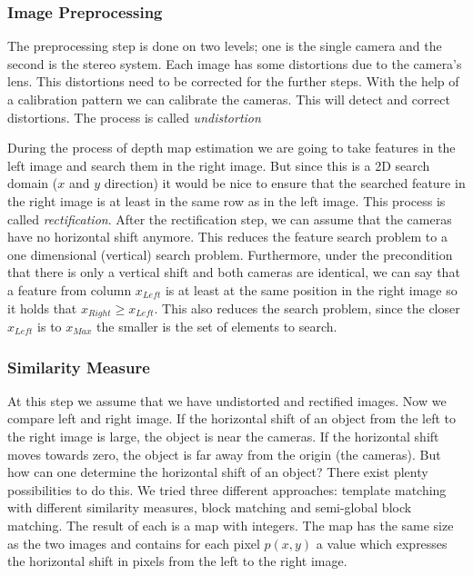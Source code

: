 \documentclass[11pt]{article}
\begin{document}
\subsubsection{Image Preprocessing} %
The preprocessing step is done on two levels; one is the single camera and the second is the stereo system. Each image has some distortions due to the camera's lens. This distortions need to be corrected for the further steps. With the help of a calibration pattern we can calibrate the cameras. This will detect and correct distortions. The process is called \emph{undistortion}

During the process of depth map estimation we are going to take features in the left image and search them in the right image. But since this is a 2D search domain ($x$ and $y$ direction) it would be nice to ensure that the searched feature in the right image is at least in the same row as in the left image. This process is called \emph{rectification}. After the rectification step, we can assume that the cameras have no horizontal shift anymore. This reduces the feature search problem to a one dimensional (vertical) search problem. Furthermore, under the precondition that there is only a vertical shift and both cameras are identical, we can say that a feature from column $x_{Left}$ is at least at the same position in the right image so it holds that $x_{Right}\geq x_{Left}$. This also reduces the search problem, since the closer $x_{Left}$ is to $x_{Max}$ the smaller is the set of elements to search.

\subsubsection{Similarity Measure}
At this step we assume that we have undistorted and rectified images. Now we compare left and right image. If the horizontal shift of an object from the left to the right image is large, the object is near the cameras. If the horizontal shift moves towards zero, the object is far away from the origin (the cameras). But how can one determine the horizontal shift of an object? There exist plenty possibilities to do this. We tried three different approaches: template matching with different similarity measures, block matching and semi-global block matching. The result of each is a map with integers. The map has the same size as the two images and contains for each pixel $p(x,y)$ a value which expresses the horizontal shift in pixels from the left to the right image. %
\end{document}
